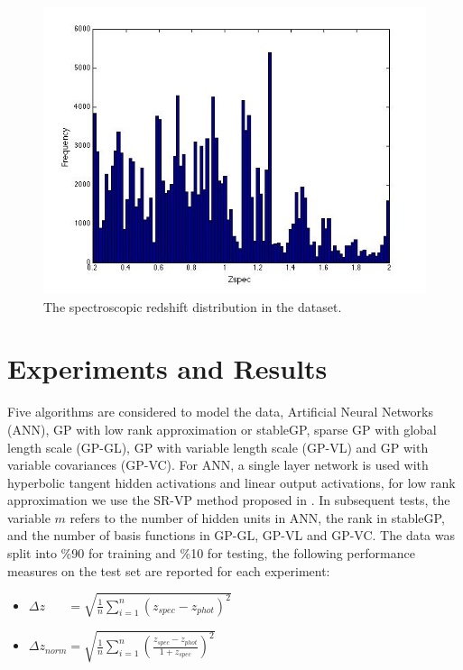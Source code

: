 \documentclass[useAMS,usenatbib,fleqn]{mn2e}
\begin{document}
\begin{figure}
       \centering
       \includegraphics[width=\columnwidth]{figures/zpec.jpg}
        \caption{The spectroscopic redshift distribution in the dataset.} 
       \label{fig-zpec-hostogram}
\end{figure}

\section{Experiments and Results}
\label{sec-experiments}

Five algorithms are considered to model the data, Artificial Neural Networks (ANN), GP with low rank approximation or stableGP, sparse GP with global length scale (GP-GL), GP with variable length scale (GP-VL) and  GP with variable covariances (GP-VC). For ANN, a single layer network is used with hyperbolic tangent hidden activations and linear output activations, for low rank approximation we use the SR-VP method proposed in \cite{}. In subsequent tests, the variable $m$ refers to the number of hidden units in ANN, the rank in stableGP, and the number of basis functions in GP-GL, GP-VL and GP-VC. The data was split into \%90 for training and \%10 for testing, the following performance measures on the test set are reported for each experiment:

\begin{itemize}
  \item $\Delta z_{\phantom{norm}} = \sqrt{\frac{1}{n}\sum_{i=1}^{n}\left(z_{spec}-z_{phot}\right)^{2}}$
  \item $\Delta z_{norm} = \sqrt{\frac{1}{n}\sum_{i=1}^{n}\left(\frac{z_{spec}-z_{phot}}{1+z_{spec}}\right)^{2}}$
\end{itemize}
\end{document}
